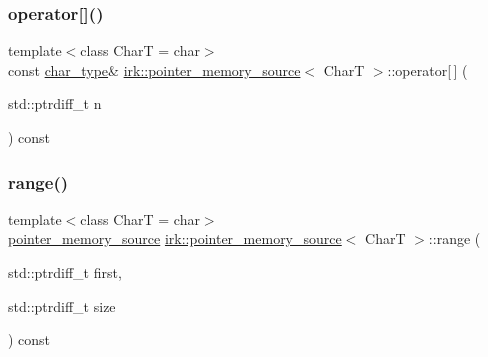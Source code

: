 \mbox{\label{classirk_1_1pointer__memory__source_afefcceccbd8ed5c7bbbb9fe10a540a18}} 
\subsubsection{\texorpdfstring{operator[]()}{operator[]()}}
{\footnotesize\ttfamily template$<$class CharT  = char$>$ \\
const \mbox{\hyperlink{classirk_1_1pointer__memory__source_a4b778df8efee229fdafbd4de413dbf61}{char\+\_\+type}}\& \mbox{\hyperlink{classirk_1_1pointer__memory__source}{irk\+::pointer\+\_\+memory\+\_\+source}}$<$ CharT $>$\+::operator\mbox{[}$\,$\mbox{]} (\begin{DoxyParamCaption}\item[{std\+::ptrdiff\+\_\+t}]{n }\end{DoxyParamCaption}) const\hspace{0.3cm}{\ttfamily [inline]}}

\mbox{\label{classirk_1_1pointer__memory__source_aaa293b1a679eed5eebcf91f0bb1f5023}} 
\subsubsection{\texorpdfstring{range()}{range()}}
{\footnotesize\ttfamily template$<$class CharT  = char$>$ \\
\mbox{\hyperlink{classirk_1_1pointer__memory__source}{pointer\+\_\+memory\+\_\+source}} \mbox{\hyperlink{classirk_1_1pointer__memory__source}{irk\+::pointer\+\_\+memory\+\_\+source}}$<$ CharT $>$\+::range (\begin{DoxyParamCaption}\item[{std\+::ptrdiff\+\_\+t}]{first,  }\item[{std\+::ptrdiff\+\_\+t}]{size }\end{DoxyParamCaption}) const\hspace{0.3cm}{\ttfamily [inline]}}

